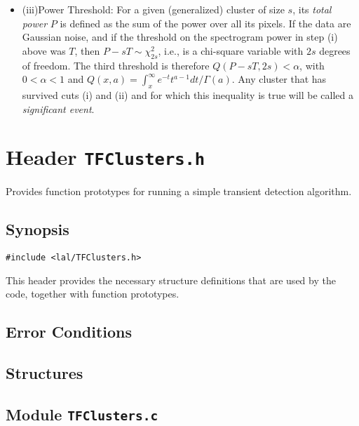 \begin{itemize}
\item{(iii)Power Threshold:} For a given (generalized) cluster of size $s$, its {\it total power} $P$ is defined as the sum of the power over all its pixels. If the data are Gaussian noise, and if the threshold on the spectrogram power in step (i) above was $T$, then $P-sT \sim \chi^2_{2s}$, i.e., is a chi-square variable with $2s$ degrees of freedom. The third threshold is therefore $Q(P-sT,2s) < \alpha$, with $0<\alpha<1$ and $Q(x,a) = \int_x^\infty e^{-t}t^{a-1} dt / \Gamma(a)$. Any cluster that has survived cuts (i) and (ii) and for which this inequality is true will be called a {\it significant event}.
\end{itemize}

\newpage
\section{Header \texttt{TFClusters.h}}
\label{s:TFClusters.h}

\noindent Provides function prototypes for running a simple transient detection algorithm.

\subsection*{Synopsis}
\begin{verbatim}
#include <lal/TFClusters.h>
\end{verbatim}

\noindent This header provides the necessary structure definitions that are used by the code, together with function prototypes.

\subsection*{Error Conditions}


\newpage
\subsection*{Structures}


\newpage
\subsection{Module \texttt{TFClusters.c}}
\label{ss:TFClusters.c}



